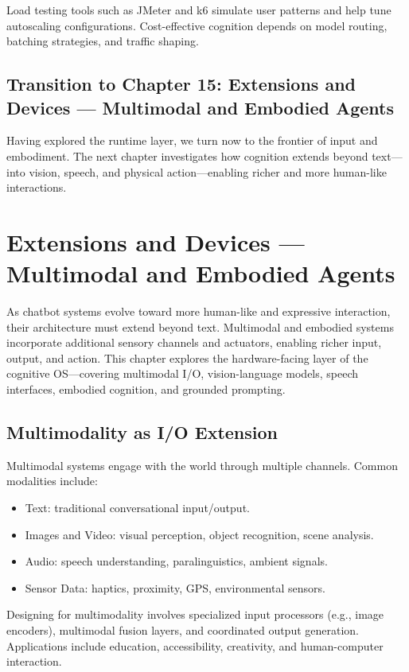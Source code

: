 \documentclass{book}
\begin{document}
Load testing tools such as JMeter and k6 simulate user patterns and help tune autoscaling configurations. Cost-effective cognition depends on model routing, batching strategies, and traffic shaping.

\section*{Transition to Chapter 15: Extensions and Devices — Multimodal and Embodied Agents}

Having explored the runtime layer, we turn now to the frontier of input and embodiment. The next chapter investigates how cognition extends beyond text—into vision, speech, and physical action—enabling richer and more human-like interactions.

\chapter{Extensions and Devices — Multimodal and Embodied Agents}

As chatbot systems evolve toward more human-like and expressive interaction, their architecture must extend beyond text. Multimodal and embodied systems incorporate additional sensory channels and actuators, enabling richer input, output, and action. This chapter explores the hardware-facing layer of the cognitive OS—covering multimodal I/O, vision-language models, speech interfaces, embodied cognition, and grounded prompting.

\section{Multimodality as I/O Extension}

Multimodal systems engage with the world through multiple channels. Common modalities include:

\begin{itemize}
  \item Text: traditional conversational input/output.
  \item Images and Video: visual perception, object recognition, scene analysis.
  \item Audio: speech understanding, paralinguistics, ambient signals.
  \item Sensor Data: haptics, proximity, GPS, environmental sensors.
\end{itemize}

Designing for multimodality involves specialized input processors (e.g., image encoders), multimodal fusion layers, and coordinated output generation. Applications include education, accessibility, creativity, and human-computer interaction.
\end{document}
